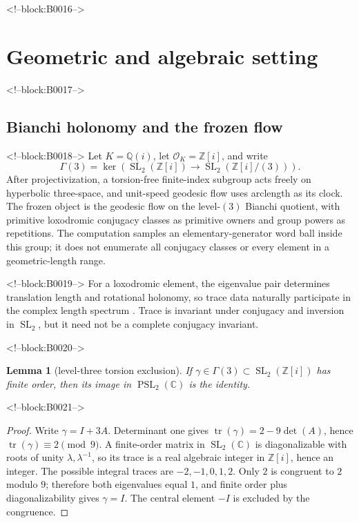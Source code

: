 \documentclass[11pt,a4paper]{article}
\newtheorem{lemma}[theorem]{Lemma}
\theoremstyle{definition}
\theoremstyle{remark}
\newcommand{\SL}{\operatorname{SL}}
\newcommand{\tr}{\operatorname{tr}}
\newcommand{\Gauss}{\mathbb{Z}[i]}
\begin{document}
<!--block:B0016-->
\section{Geometric and algebraic setting}

<!--block:B0017-->
\subsection{Bianchi holonomy and the frozen flow}

<!--block:B0018-->
Let \(K=\mathbb{Q}(i)\), let \(\mathcal O_K=\Gauss\), and write
\[
 \Gamma(3)=\ker\!\left(\SL_2(\Gauss)\longrightarrow\SL_2(\Gauss/(3))\right).
\]
After projectivization, a torsion-free finite-index subgroup acts freely on hyperbolic three-space, and unit-speed geodesic flow uses arclength as its clock. The frozen object is the geodesic flow on the level-\((3)\) Bianchi quotient, with primitive loxodromic conjugacy classes as primitive owners and group powers as repetitions. The computation samples an elementary-generator word ball inside this group; it does not enumerate all conjugacy classes or every element in a geometric-length range.

<!--block:B0019-->
For a loxodromic element, the eigenvalue pair determines translation length and rotational holonomy, so trace data naturally participate in the complex length spectrum \citep[Introduction and Sec.~2]{LinLipnowski2022}. Trace is invariant under conjugacy and inversion in \(\SL_2\), but it need not be a complete conjugacy invariant.

<!--block:B0020-->
\begin{lemma}[level-three torsion exclusion]\label{lem:torsion}
If \(\gamma\in\Gamma(3)\subset\SL_2(\Gauss)\) has finite order, then its image in \(\operatorname{PSL}_2(\mathbb C)\) is the identity.
\end{lemma}

<!--block:B0021-->
\begin{proof}
Write \(\gamma=I+3A\). Determinant one gives \(\tr(\gamma)=2-9\det(A)\), hence \(\tr(\gamma)\equiv2\pmod 9\). A finite-order matrix in \(\SL_2(\mathbb C)\) is diagonalizable with roots of unity \(\lambda,\lambda^{-1}\), so its trace is a real algebraic integer in \(\Gauss\), hence an integer. The possible integral traces are \(-2,-1,0,1,2\). Only \(2\) is congruent to \(2\) modulo \(9\); therefore both eigenvalues equal \(1\), and finite order plus diagonalizability gives \(\gamma=I\). The central element \(-I\) is excluded by the congruence.
\end{proof}
\end{document}
